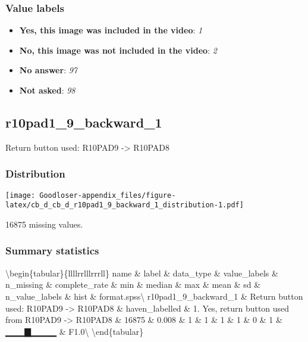 \documentclass[
]{book}
\providecommand{\tightlist}{%
  \setlength{\itemsep}{0pt}\setlength{\parskip}{0pt}}
\begin{document}
\hypertarget{r10pad9_labels}{%
\subsubsection{Value labels}\label{r10pad9_labels}}

\begin{itemize}
\tightlist
\item
  \textbf{Yes, this image was included in the video}: \emph{1}
\item
  \textbf{No, this image was not included in the video}: \emph{2}
\item
  \textbf{No answer}: \emph{97}
\item
  \textbf{Not asked}: \emph{98}
\end{itemize}

\hypertarget{r10pad1_9_backward_1}{%
\subsection{r10pad1\_9\_backward\_1}\label{r10pad1_9_backward_1}}

Return button used: R10PAD9 -\textgreater{} R10PAD8

\hypertarget{r10pad1_9_backward_1_distribution}{%
\subsubsection{Distribution}\label{r10pad1_9_backward_1_distribution}}

\texttt{[image: Goodloser-appendix\_files/figure-latex/cb\_d\_cb\_d\_r10pad1\_9\_backward\_1\_distribution-1.pdf]}

16875 missing values.

\hypertarget{r10pad1_9_backward_1_summary}{%
\subsubsection{Summary statistics}\label{r10pad1_9_backward_1_summary}}

\textbackslash begin\{tabular\}\{l\textbar l\textbar l\textbar l\textbar r\textbar r\textbar l\textbar l\textbar l\textbar r\textbar r\textbar r\textbar l\textbar l\}
\hline
name \& label \& data\_type \& value\_labels \& n\_missing \& complete\_rate \& min \& median \& max \& mean \& sd \& n\_value\_labels \& hist \& format.spss\textbackslash{}
\hline
r10pad1\_9\_backward\_1 \& Return button used: R10PAD9 -\textgreater{} R10PAD8 \& haven\_labelled \& 1. Yes, return button used from R10PAD9 -\textgreater{} R10PAD8 \& 16875 \& 0.008 \& 1 \& 1 \& 1 \& 1 \& 0 \& 1 \& ▁▁▁▇▁▁▁▁ \& F1.0\textbackslash{}
\hline
\textbackslash end\{tabular\}
\end{document}
